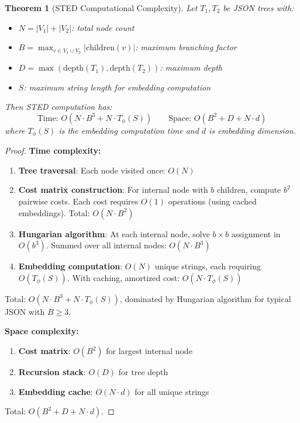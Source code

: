 \documentclass{article}
\newtheorem{theorem}{Theorem}
\begin{document}
\begin{theorem}[STED Computational Complexity]
\label{thm:complexity}
Let $T_1, T_2$ be JSON trees with:
\begin{itemize}
    \item $N = |V_1| + |V_2|$: total node count
    \item $B = \max_{v \in V_1 \cup V_2} |\text{children}(v)|$: maximum branching factor
    \item $D = \max(\text{depth}(T_1), \text{depth}(T_2))$: maximum depth
    \item $S$: maximum string length for embedding computation
\end{itemize}

Then STED computation has:
\begin{equation}
    \text{Time: } O(N \cdot B^3 + N \cdot T_\phi(S)) \qquad \text{Space: } O(B^2 + D + N \cdot d)
\end{equation}
where $T_\phi(S)$ is the embedding computation time and $d$ is embedding dimension.
\end{theorem}

\begin{proof}
\textbf{Time complexity:}
\begin{enumerate}
    \item \textbf{Tree traversal}: Each node visited once: $O(N)$
    \item \textbf{Cost matrix construction}: For internal node with $b$ children, compute $b^2$ pairwise costs. Each cost requires $O(1)$ operations (using cached embeddings). Total: $O(N \cdot B^2)$
    \item \textbf{Hungarian algorithm}: At each internal node, solve $b \times b$ assignment in $O(b^3)$. Summed over all internal nodes: $O(N \cdot B^3)$
    \item \textbf{Embedding computation}: $O(N)$ unique strings, each requiring $O(T_\phi(S))$. With caching, amortized cost: $O(N \cdot T_\phi(S))$
\end{enumerate}

Total: $O(N \cdot B^3 + N \cdot T_\phi(S))$, dominated by Hungarian algorithm for typical JSON with $B \geq 3$.

\textbf{Space complexity:}
\begin{enumerate}
    \item \textbf{Cost matrix}: $O(B^2)$ for largest internal node
    \item \textbf{Recursion stack}: $O(D)$ for tree depth
    \item \textbf{Embedding cache}: $O(N \cdot d)$ for all unique strings
\end{enumerate}

Total: $O(B^2 + D + N \cdot d)$.
\end{proof}
\end{document}
